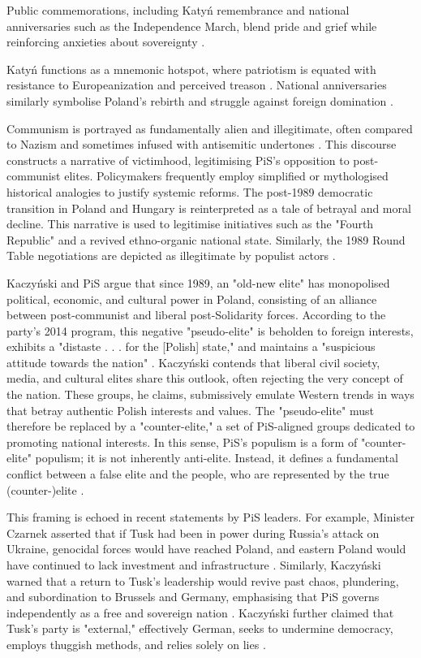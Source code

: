 \pagebreak

Public commemorations, including Katyń remembrance and national anniversaries such as the Independence March, blend pride and grief while reinforcing anxieties about sovereignty \citep{pis_program_2023}.

Katyń functions as a mnemonic hotspot, where patriotism is equated with resistance to Europeanization and perceived treason \citep{fredheim_memory_2014}. National anniversaries similarly symbolise Poland’s rebirth and struggle against foreign domination \citep{kobierecki_opportunistic_2022}.

Communism is portrayed as fundamentally alien and illegitimate, often compared to Nazism and sometimes infused with antisemitic undertones \citep{korycki_memory_2017}. This discourse constructs a narrative of victimhood, legitimising PiS’s opposition to post-communist elites. Policymakers frequently employ simplified or mythologised historical analogies to justify systemic reforms. The post-1989 democratic transition in Poland and Hungary is reinterpreted as a tale of betrayal and moral decline. This narrative is used to legitimise initiatives such as the "Fourth Republic" and a revived ethno-organic national state. Similarly, the 1989 Round Table negotiations are depicted as illegitimate by populist actors \citep{pozarlik_momentarily_2022}.

Kaczyński and PiS argue that since 1989, an "old-new elite" has monopolised political, economic, and cultural power in Poland, consisting of an alliance between post-communist and liberal post-Solidarity forces. According to the party’s 2014 program, this negative "pseudo-elite" is beholden to foreign interests, exhibits a "distaste . . . for the [Polish] state," and maintains a "suspicious attitude towards the nation" \citep{bill_counter-elite_2022}. Kaczyński contends that liberal civil society, media, and cultural elites share this outlook, often rejecting the very concept of the nation. These groups, he claims, submissively emulate Western trends in ways that betray authentic Polish interests and values. The "pseudo-elite" must therefore be replaced by a "counter-elite," a set of PiS-aligned groups dedicated to promoting national interests. In this sense, PiS’s populism is a form of "counter-elite" populism; it is not inherently anti-elite. Instead, it defines a fundamental conflict between a false elite and the people, who are represented by the true (counter-)elite \citep{bill_counter-elite_2022}.

This framing is echoed in recent statements by PiS leaders. For example, Minister Czarnek asserted that if Tusk had been in power during Russia’s attack on Ukraine, genocidal forces would have reached Poland, and eastern Poland would have continued to lack investment and infrastructure \citep{pisorgpl2023p}. Similarly, Kaczyński warned that a return to Tusk’s leadership would revive past chaos, plundering, and subordination to Brussels and Germany, emphasising that PiS governs independently as a free and sovereign nation \citep{pisorgpl2023q}. Kaczyński further claimed that Tusk’s party is "external," effectively German, seeks to undermine democracy, employs thuggish methods, and relies solely on lies \citep{pisorgpl2023r}.

